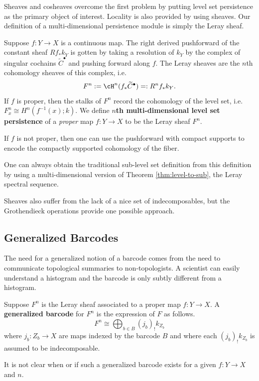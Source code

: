 Sheaves and cosheaves overcome the first problem by putting level set persistence as the primary object of interest. Locality is also provided by using sheaves. Our definition of a multi-dimensional persistence module is simply the Leray sheaf.

\begin{defn}
Suppose $f:Y\to X$ is a continuous map. The right derived pushforward of the constant sheaf $Rf_*k_Y$ is gotten by taking a resolution of $k_Y$ by the complex of singular cochains $\widetilde{C}^{\bullet}$ and pushing forward along $f$. The Leray sheaves are the $n$th cohomology sheaves of this complex, i.e.
\[
F^n:=\cH^n(f_*\widetilde{C}^{\bullet})=:R^nf_*k_Y.
\]
If $f$ is proper, then the stalks of $F^n$ record the cohomology of the level set, i.e. $F^n_x\cong H^n(f^{-1}(x);k)$. We define \textbf{$n$th multi-dimensional level set persistence} of a \emph{proper} map $f:Y\to X$ to be the Leray sheaf $F^n$.
\end{defn}

\begin{rmk}
 If $f$ is not proper, then one can use the pushforward with compact supports to encode the compactly supported cohomology of the fiber.
\end{rmk}

One can always obtain the traditional sub-level set definition from this definition by using a multi-dimensional version of Theorem \ref{thm:level-to-sub}, the Leray spectral sequence.

Sheaves also suffer from the lack of a nice set of indecomposables, but the Grothendieck operations provide one possible approach.

\subsection{Generalized Barcodes}
\label{subsec:barcode_ss}

The need for a generalized notion of a barcode comes from the need to communicate topological summaries to non-topologists. A scientist can easily understand a histogram and the barcode is only subtly different from a histogram.

\begin{defn}\label{defn:generalized_bc}
	Suppose $F^n$ is the Leray sheaf associated to a proper map $f:Y\to X$. A \textbf{generalized barcode} for $F^n$ is the expression of $F$ as follows.
	\[
	F^n\cong \bigoplus_{b\in B} (j_b)_! k_{Z_b}
	\]
	where $j_b:Z_b\to X$ are maps indexed by the barcode $B$ and where each $(j_b)_! k_{Z_b}$ is assumed to be indecomposable.
\end{defn}
\begin{rmk}
It is not clear when or if such a generalized barcode exists for a given $f:Y\to X$ and $n$.
\end{rmk}

